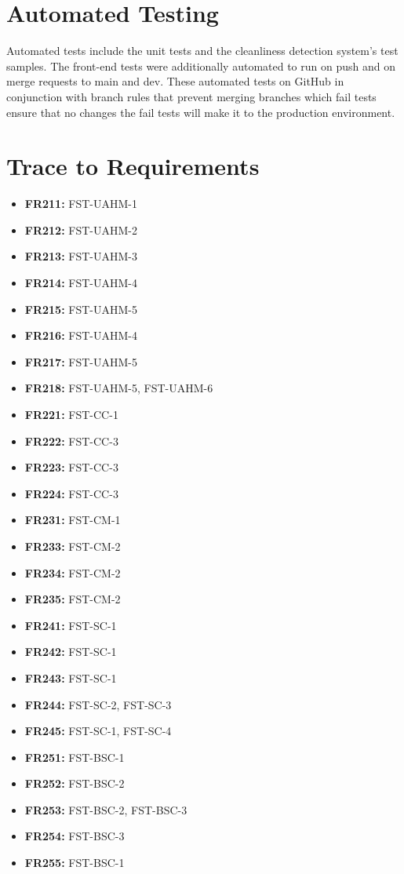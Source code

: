 \documentclass[12pt, titlepage]{article}
\begin{document}
\section{Automated Testing}
Automated tests include the unit tests and the cleanliness detection system's test samples. The front-end tests were additionally automated to run on push and on merge requests to main and dev. These automated tests on GitHub in conjunction with branch rules that prevent merging branches which fail tests ensure that no changes the fail tests will make it to the production environment.
		
\section{Trace to Requirements}
    \begin{itemize}
      \item \textbf{FR211:} FST-UAHM-1
      \item \textbf{FR212:} FST-UAHM-2
      \item \textbf{FR213:} FST-UAHM-3
      \item \textbf{FR214:} FST-UAHM-4
      \item \textbf{FR215:} FST-UAHM-5
      \item \textbf{FR216:} FST-UAHM-4
      \item \textbf{FR217:} FST-UAHM-5
      \item \textbf{FR218:} FST-UAHM-5, FST-UAHM-6
      \item \textbf{FR221:} FST-CC-1
      \item \textbf{FR222:} FST-CC-3
      \item \textbf{FR223:} FST-CC-3
      \item \textbf{FR224:} FST-CC-3
      \item \textbf{FR231:} FST-CM-1
      \item \textbf{FR233:} FST-CM-2
      \item \textbf{FR234:} FST-CM-2
      \item \textbf{FR235:} FST-CM-2
      \item \textbf{FR241:} FST-SC-1
      \item \textbf{FR242:} FST-SC-1
      \item \textbf{FR243:} FST-SC-1
      \item \textbf{FR244:} FST-SC-2, FST-SC-3
      \item \textbf{FR245:} FST-SC-1, FST-SC-4
      \item \textbf{FR251:} FST-BSC-1
      \item \textbf{FR252:} FST-BSC-2
      \item \textbf{FR253:} FST-BSC-2, FST-BSC-3
      \item \textbf{FR254:} FST-BSC-3
      \item \textbf{FR255:} FST-BSC-1
    \end{itemize}
\end{document}
